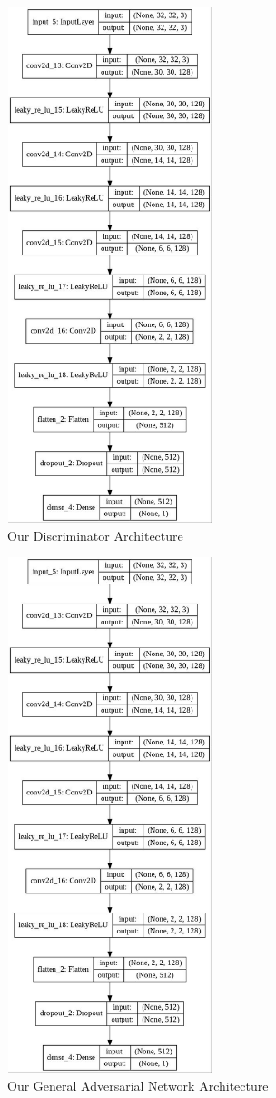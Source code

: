 \documentclass[conference]{IEEEtran}
\begin{document}
\begin{figure}[h]
\includegraphics[width=6cm, height=15cm]{Dis.jpeg}
\caption{Our Discriminator Architecture}
\end{figure}
\begin{figure}[h]
\includegraphics[width=6cm, height=15cm]{GAN.jpeg}
\caption{Our General Adversarial Network Architecture}
\end{figure}
\end{document}
